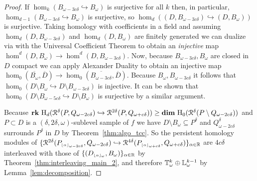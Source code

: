 \begin{proof}
  If $\hom_k(B_{\omega-3c\delta}\hookrightarrow B_\omega)$ is surjective for all $k$ then, in particular, $\hom_{d-1}(B_{\omega-3c\delta}\hookrightarrow B_\omega)$ is surjective, so $\hom_d((D, B_{\omega-3c\delta})\hookrightarrow (D, B_\omega))$ is surjective.
  Taking homology with coefficients in a field and assuming $\hom_d(D, B_{\omega-3c\delta})$ and $\hom_d(D, B_\omega)$ are finitely generated we can dualize via with the Universal Coefficient Theorem to obtain an \emph{injective} map $\hom^d(D,B_\omega)\to \hom^d(D,B_{\omega-3c\delta})$.
  Now, because $B_{\omega-3c\delta}, B_\omega$ are closed in $D$ compact we can apply Alexander Duality to obtain an injective map $\hom_0(\overline{B_\omega}, \overline{D})\to\hom_0(\overline{B_{\omega-3c\delta}}, \overline{D})$.
  Because $B_\omega,B_{\omega-3c\delta}$ it follows that $\hom_0(D\setminus B_\omega\hookrightarrow D\setminus B_{\omega-3c\delta})$ is injective.
  It can be shown that $\hom_0(D\setminus B_{\omega-5c\delta}\hookrightarrow D\setminus B_\omega)$ is surjective by a similar argument.

  Because $\mathbf{rk}~\mathrm{H}_d(\mathcal{R}^\delta(P, Q_{\omega - 2c\delta})\hookrightarrow \mathcal{R}^{2\delta}(P, Q_{\omega+c\delta})) \geq \mathbf{dim}~\mathrm{H}_0(\mathcal{R}^\delta(P\setminus Q_{\omega-2c\delta}))$ and $P\subset D$ is a $(\delta, 2\delta,\omega)$-sublevel sample of $f$ we have $D\setminus B_\omega\subseteq P^\delta$ and $Q_{\omega-2c\delta}^\delta$ surrounds $P^\delta$ in $D$ by Theorem~\ref{thm:algo_tcc}.
  So the persistent homology modules of $\{\mathcal{R}^{2\delta}(P_{\scriptscriptstyle \lfloor\alpha\rfloor_{\omega-2c\delta}}, Q_{\omega-2c\delta})\hookrightarrow \mathcal{R}^{4\delta}(P_{\scriptscriptstyle \lfloor\alpha\rfloor_{\omega+c\delta}}, Q_{\omega+c\delta})\}_{\alpha\in\mathbb{R}}$ are $4c\delta$ interleaved with those of $\{(D_{\scriptscriptstyle \lfloor\alpha\rfloor_{\omega}}, B_\omega)\}_{\alpha\in\mathbb{R}}$ by Theorem~\ref{thm:interleaving_main_2}, and therefore $\mathbb{T}_{\omega}^k \oplus \mathbb{L}_\omega^{k-1}$ by Lemma~\ref{lem:decomposition}.
\end{proof}
